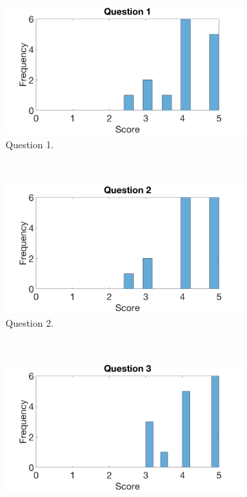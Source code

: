 \documentclass[main.tex]{subfiles}
\begin{document}
\begin{figure}[htb]
	\captionsetup[subfigure]{position=b}
        \centering
        \begin{subfigure}{.47\textwidth}
                \includegraphics[width=\textwidth]{pics/q1}
                \caption{Question 1.}
                \label{fig:survey1}
        \end{subfigure}
        ~
		\begin{subfigure}{.47\textwidth}
                \includegraphics[width=\textwidth]{pics/q2}
                \caption{Question 2.}
                \label{fig:survey2}
        \end{subfigure}
		\\
		\begin{subfigure}{.47\textwidth}
				\includegraphics[width=\textwidth]{pics/q3}

\end{subfigure}
\end{figure}
\end{document}
